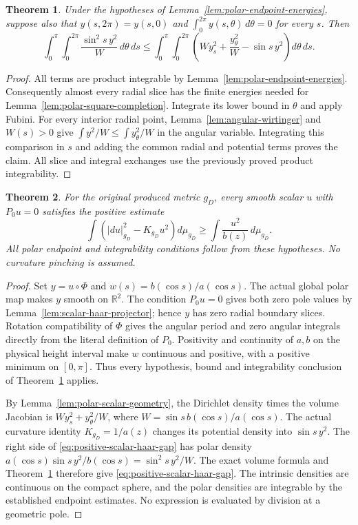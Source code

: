 \documentclass[11pt]{article}
\newtheorem{theorem}{Theorem}[section]
\newcommand{\R}{\mathbb R}
\begin{document}
\begin{theorem}\label{thm:positive-polar-gap}
Under the hypotheses of Lemma~\ref{lem:polar-endpoint-energies}, suppose also
that $y(s,2\pi)=y(s,0)$ and $\int_0^{2\pi}y(s,\theta)\,d\theta=0$ for every $s$.
Then
\[
 \int_0^\pi\int_0^{2\pi}\frac{\sin^2s\,y^2}{W}\,d\theta\,ds
 \leq\int_0^\pi\int_0^{2\pi}
    \left(Wy_s^2+\frac{y_\theta^2}{W}-\sin s\,y^2\right)d\theta\,ds.
\]
\end{theorem}

\begin{proof}
All terms are product integrable by Lemma~\ref{lem:polar-endpoint-energies}.
Consequently almost every radial slice has the finite energies needed for
Lemma~\ref{lem:polar-square-completion}. Integrate its lower bound in $\theta$
and apply Fubini. For every interior radial point, Lemma~\ref{lem:angular-wirtinger}
and $W(s)>0$ give $\int y^2/W\leq\int y_\theta^2/W$ in the angular variable.
Integrating this comparison in $s$ and adding the common radial and potential
terms proves the claim. All slice and integral exchanges use the previously
proved product integrability.
\end{proof}

\begin{theorem}\label{thm:positive-scalar-haar-gap}
For the original produced metric $g_D$, every smooth scalar $u$ with $P_0u=0$
satisfies the positive estimate
\begin{equation}\label{eq:positive-scalar-haar-gap}
 \int\left(|du|_{g_D}^2-K_{g_D}u^2\right)d\mu_{g_D}
       \geq\int\frac{u^2}{b(z)}\,d\mu_{g_D}.
\end{equation}
All polar endpoint and integrability conditions follow from these hypotheses.
No curvature pinching is assumed.
\end{theorem}

\begin{proof}
Set $y=u\circ\Phi$ and $w(s)=b(\cos s)/a(\cos s)$.
The actual global polar map makes $y$ smooth on $\R^2$.
The condition $P_0u=0$ gives both zero pole values by
Lemma~\ref{lem:scalar-haar-projector}; hence $y$ has zero radial boundary slices.
Rotation compatibility of $\Phi$ gives the angular period and zero angular
integrals directly from the literal definition of $P_0$.
Positivity and continuity of $a,b$ on the physical height interval make $w$
continuous and positive, with a positive minimum on $[0,\pi]$.
Thus every hypothesis, bound and integrability conclusion of
Theorem~\ref{thm:positive-polar-gap} applies.

By Lemma~\ref{lem:polar-scalar-geometry}, the Dirichlet density times the volume
Jacobian is $Wy_s^2+y_\theta^2/W$, where $W=\sin s\,b(\cos s)/a(\cos s)$.
The actual curvature identity $K_{g_D}=1/a(z)$ changes its potential density
into $\sin s\,y^2$. The right side of \eqref{eq:positive-scalar-haar-gap} has
polar density $a(\cos s)\sin s\,y^2/b(\cos s)=\sin^2s\,y^2/W$.
The exact volume formula and Theorem~\ref{thm:positive-polar-gap} therefore give
\eqref{eq:positive-scalar-haar-gap}. The intrinsic densities are continuous on
the compact sphere, and the polar densities are integrable by the established
endpoint estimates. No expression is evaluated by division at a geometric pole.
\end{proof}
\end{document}
